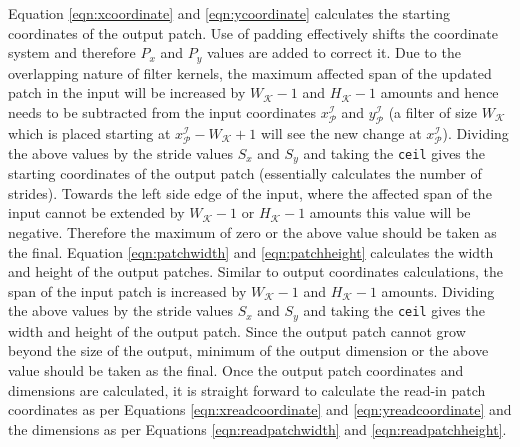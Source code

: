 Equation \ref{eqn:xcoordinate} and \ref{eqn:ycoordinate} calculates the starting coordinates of the output patch.
Use of padding effectively shifts the coordinate system and therefore $P_x$ and $P_y$ values are added to correct it.
Due to the overlapping nature of filter kernels, the maximum affected span of the updated patch in the input will be increased by $W_\mathcal{K}-1$ and $H_\mathcal{K}-1$ amounts and hence needs to be subtracted from the input coordinates $x^\mathcal{I}_\mathcal{P}$ and $y^\mathcal{I}_\mathcal{P}$ (a filter of size $W_\mathcal{K}$ which is placed starting at $x^\mathcal{I}_\mathcal{P} - W_\mathcal{K} + 1$ will see the new change at $x^\mathcal{I}_\mathcal{P}$).
Dividing the above values by the stride values $S_x$ and $S_y$ and taking the \texttt{ceil} gives the starting coordinates of the output patch (essentially calculates the number of strides).
Towards the left side edge of the input, where the affected span of the input cannot be extended by $W_\mathcal{K}-1$ or $H_\mathcal{K}-1$ amounts this value will be negative.
Therefore the maximum of zero or the above value should be taken as the final.
Equation \ref{eqn:patchwidth} and \ref{eqn:patchheight} calculates the width and height of the output patches.
Similar to output coordinates calculations, the span of the input patch is increased by $W_\mathcal{K}-1$ and $H_\mathcal{K}-1$ amounts.
Dividing the above values by the stride values $S_x$ and $S_y$ and taking the \texttt{ceil} gives the width and height of the output patch.
Since the output patch cannot grow beyond the size of the output, minimum of the output dimension or the above value should be taken as the final.
Once the output patch coordinates and dimensions are calculated, it is straight forward to calculate the read-in patch coordinates as per Equations \ref{eqn:xreadcoordinate} and \ref{eqn:yreadcoordinate} and the dimensions as per Equations \ref{eqn:readpatchwidth} and \ref{eqn:readpatchheight}.

